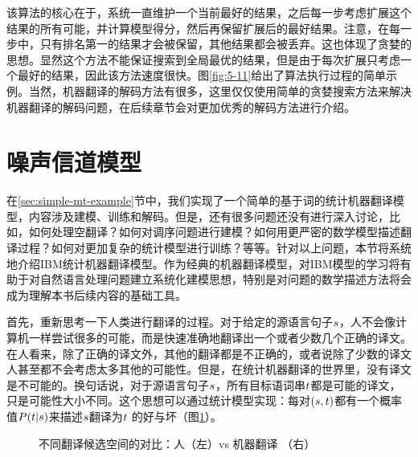 \parinterval 该算法的核心在于，系统一直维护一个当前最好的结果，之后每一步考虑扩展这个结果的所有可能，并计算模型得分，然后再保留扩展后的最好结果。注意，在每一步中，只有排名第一的结果才会被保留，其他结果都会被丢弃。这也体现了贪婪的思想。显然这个方法不能保证搜索到全局最优的结果，但是由于每次扩展只考虑一个最好的结果，因此该方法速度很快。图\ref{fig:5-11}给出了算法执行过程的简单示例。当然，机器翻译的解码方法有很多，这里仅仅使用简单的贪婪搜索方法来解决机器翻译的解码问题，在后续章节会对更加优秀的解码方法进行介绍。

\sectionnewpage
\section{噪声信道模型}

\vspace{0.5em}

\parinterval 在\ref{sec:simple-mt-example}节中，我们实现了一个简单的基于词的统计机器翻译模型，内容涉及建模、训练和解码。但是，还有很多问题还没有进行深入讨论，比如，如何处理空翻译？如何对调序问题进行建模？如何用更严密的数学模型描述翻译过程？如何对更加复杂的统计模型进行训练？等等。针对以上问题，本节将系统地介绍IBM统计机器翻译模型。作为经典的机器翻译模型，对IBM模型的学习将有助于对自然语言处理问题建立系统化建模思想，特别是对问题的数学描述方法将会成为理解本书后续内容的基础工具。

\parinterval 首先，重新思考一下人类进行翻译的过程。对于给定的源语言句子${s}$，人不会像计算机一样尝试很多的可能，而是快速准确地翻译出一个或者少数几个正确的译文。在人看来，除了正确的译文外，其他的翻译都是不正确的，或者说除了少数的译文人甚至都不会考虑太多其他的可能性。但是，在统计机器翻译的世界里，没有译文是不可能的。换句话说，对于源语言句子${s}$，所有目标语词串${t}$都是可能的译文，只是可能性大小不同。这个思想可以通过统计模型实现：每对$({s},{t})$都有一个概率值${P}({t}|{s})$来描述${s}$翻译为${t}$ 的好与坏（图\ref{fig:5-12}）。

\begin{figure}[htp]
    \centering

\caption{不同翻译候选空间的对比：人（左）vs 机器翻译 （右）}
    \label{fig:5-12}
\end{figure}

